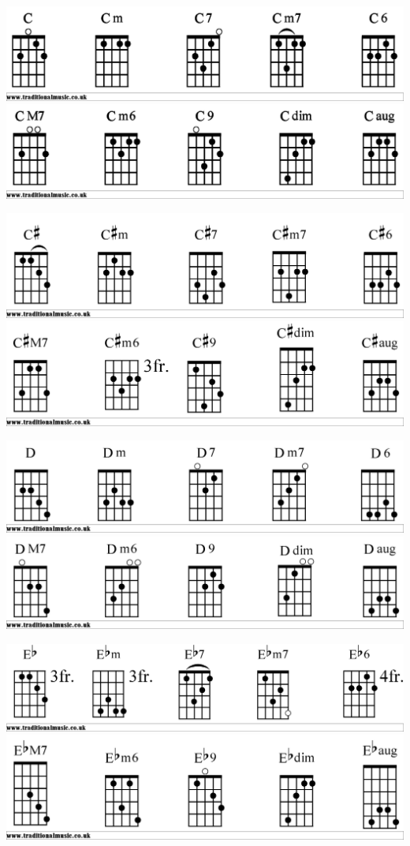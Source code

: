 \includegraphics[scale=.15]{Cbjo1}
\includegraphics[scale=.15]{Cbjo2}

\includegraphics[scale=.15]{Csbjo1}
\includegraphics[scale=.15]{Csbjo2}

\includegraphics[scale=.15]{Dbjo1}
\includegraphics[scale=.15]{Dbjo2}

\includegraphics[scale=.15]{Ebbjo1}
\includegraphics[scale=.15]{Ebbjo2}

